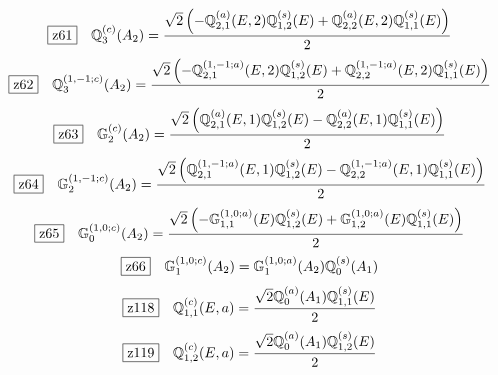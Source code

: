 \documentclass[fleqn,10pt,landscape]{jsarticle}
\begin{document}
\begin{dmath*}
\hspace*{3mm}\fbox{z61}\quad \mathbb{Q}_{3}^{(c)}(A_{2})=\frac{\sqrt{2} \left(- \mathbb{Q}_{2,1}^{(a)}(E,2) \mathbb{Q}_{1,2}^{(s)}(E) + \mathbb{Q}_{2,2}^{(a)}(E,2) \mathbb{Q}_{1,1}^{(s)}(E)\right)}{2}
\end{dmath*}
\begin{dmath*}
\hspace*{3mm}\fbox{z62}\quad \mathbb{Q}_{3}^{(1,-1;c)}(A_{2})=\frac{\sqrt{2} \left(- \mathbb{Q}_{2,1}^{(1,-1;a)}(E,2) \mathbb{Q}_{1,2}^{(s)}(E) + \mathbb{Q}_{2,2}^{(1,-1;a)}(E,2) \mathbb{Q}_{1,1}^{(s)}(E)\right)}{2}
\end{dmath*}
\begin{dmath*}
\hspace*{3mm}\fbox{z63}\quad \mathbb{G}_{2}^{(c)}(A_{2})=\frac{\sqrt{2} \left(\mathbb{Q}_{2,1}^{(a)}(E,1) \mathbb{Q}_{1,2}^{(s)}(E) - \mathbb{Q}_{2,2}^{(a)}(E,1) \mathbb{Q}_{1,1}^{(s)}(E)\right)}{2}
\end{dmath*}
\begin{dmath*}
\hspace*{3mm}\fbox{z64}\quad \mathbb{G}_{2}^{(1,-1;c)}(A_{2})=\frac{\sqrt{2} \left(\mathbb{Q}_{2,1}^{(1,-1;a)}(E,1) \mathbb{Q}_{1,2}^{(s)}(E) - \mathbb{Q}_{2,2}^{(1,-1;a)}(E,1) \mathbb{Q}_{1,1}^{(s)}(E)\right)}{2}
\end{dmath*}
\begin{dmath*}
\hspace*{3mm}\fbox{z65}\quad \mathbb{G}_{0}^{(1,0;c)}(A_{2})=\frac{\sqrt{2} \left(- \mathbb{G}_{1,1}^{(1,0;a)}(E) \mathbb{Q}_{1,2}^{(s)}(E) + \mathbb{G}_{1,2}^{(1,0;a)}(E) \mathbb{Q}_{1,1}^{(s)}(E)\right)}{2}
\end{dmath*}
\begin{dmath*}
\hspace*{3mm}\fbox{z66}\quad \mathbb{G}_{1}^{(1,0;c)}(A_{2})=\mathbb{G}_{1}^{(1,0;a)}(A_{2}) \mathbb{Q}_{0}^{(s)}(A_{1})
\end{dmath*}
\begin{dmath*}
\hspace*{3mm}\fbox{z118}\quad \mathbb{Q}_{1,1}^{(c)}(E,a)=\frac{\sqrt{2} \mathbb{Q}_{0}^{(a)}(A_{1}) \mathbb{Q}_{1,1}^{(s)}(E)}{2}
\end{dmath*}
\begin{dmath*}
\hspace*{3mm}\fbox{z119}\quad \mathbb{Q}_{1,2}^{(c)}(E,a)=\frac{\sqrt{2} \mathbb{Q}_{0}^{(a)}(A_{1}) \mathbb{Q}_{1,2}^{(s)}(E)}{2}
\end{dmath*}
\end{document}
